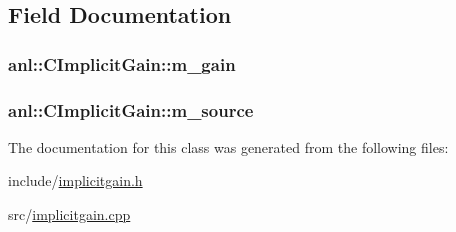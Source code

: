 \subsection{Field Documentation}
\hypertarget{classanl_1_1CImplicitGain_ac25c14cb85588a9449a3e0f3b0b35125}{
\subsubsection[{m\_\-gain}]{ {\bf anl::CImplicitGain::m\_\-gain}}}
\label{classanl_1_1CImplicitGain_ac25c14cb85588a9449a3e0f3b0b35125}
\hypertarget{classanl_1_1CImplicitGain_aa89db53619f2caf1ef0dc1326694ba25}{
\subsubsection[{m\_\-source}]{ {\bf anl::CImplicitGain::m\_\-source}}}
\label{classanl_1_1CImplicitGain_aa89db53619f2caf1ef0dc1326694ba25}


The documentation for this class was generated from the following files:\begin{DoxyCompactItemize}
\item 
include/\hyperlink{implicitgain_8h}{implicitgain.h}\item 
src/\hyperlink{implicitgain_8cpp}{implicitgain.cpp}\end{DoxyCompactItemize}
